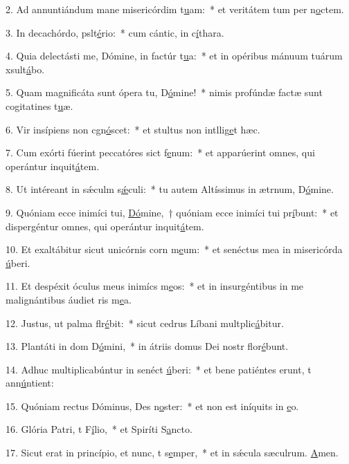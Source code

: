 2. Ad annuntiándum mane misericórdim t\uline{u}am:~* et veritátem tum per n\uline{o}ctem.\par 
3. In decachórdo, pslt\uline{é}rio:~* cum cántic, in c\uline{í}thara.\par 
4. Quia delectásti me, Dómine, in factúr t\uline{u}a:~* et in opéribus mánuum tuárum xsult\uline{á}bo.\par 
5. Quam magnificáta sunt ópera tu, D\uline{ó}mine!~* nimis profúndæ factæ sunt cogitatines t\uline{u}æ.\par 
6. Vir insípiens non cgn\uline{ó}scet:~* et stultus non intllig\uline{e}t hæc.\par 
7. Cum exórti fúerint peccatóres sict f\uline{e}num:~* et apparúerint omnes, qui operántur inquit\uline{á}tem.\par 
8. Ut intéreant in sǽculm s\uline{ǽ}culi:~* tu autem Altíssimus in ætrnum, D\uline{ó}mine.\par 
9. Quóniam ecce inimíci tui, \uline{Dó}mine,~† quóniam ecce inimíci tui pr\uline{í}bunt:~* et dispergéntur omnes, qui operántur inquit\uline{á}tem.\par 
10. Et exaltábitur sicut unicórnis corn m\uline{e}um:~* et senéctus mea in misericórda \uline{ú}beri.\par 
11. Et despéxit óculus meus inimícs m\uline{e}os:~* et in insurgéntibus in me malignántibus áudiet ris m\uline{e}a.\par 
12. Justus, ut palma flr\uline{é}bit:~* sicut cedrus Líbani multplic\uline{á}bitur.\par 
13. Plantáti in dom D\uline{ó}mini,~* in átriis domus Dei nostr flor\uline{é}bunt.\par 
14. Adhuc multiplicabúntur in senéct \uline{ú}beri:~* et bene patiéntes erunt, t ann\uline{ú}ntient:\par 
15. Quóniam rectus Dóminus, Des n\uline{o}ster:~* et non est iníquits in \uline{e}o.\par 
16. Glória Patri, t F\uline{í}lio,~* et Spiríti S\uline{a}ncto.\par 
17. Sicut erat in princípio, et nunc, t s\uline{e}mper,~* et in sǽcula sæculrum. \uline{A}men.\par 
